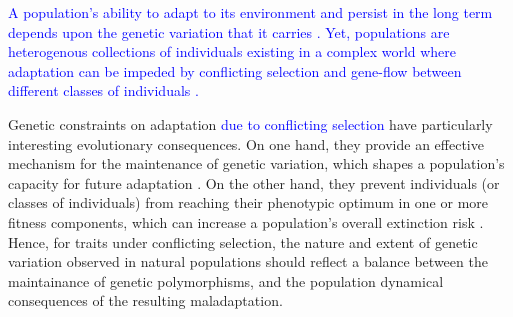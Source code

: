 \documentclass[11pt]{article}
\begin{document}
\textcolor{blue}{A population's ability to adapt to its environment and persist in the long term depends upon the genetic variation that it carries \citep{Fisher1930, Lewontin1975}. Yet, populations are heterogenous collections of individuals existing in a complex world where adaptation can be impeded by conflicting selection and gene-flow between different classes of individuals \citep{Prout2000, CharlesworthHughes2000, ConnallonHall2018}.} 

Genetic constraints on adaptation \textcolor{blue}{due to conflicting selection }have particularly interesting evolutionary consequences. On one hand, they provide an effective mechanism for the maintenance of genetic variation, which shapes a population's capacity for future adaptation \citep{Fisher1930, Prout2000, CharlesworthHughes2000, ConnallonHall2018}. On the other hand, they prevent individuals (or classes of individuals) from reaching their phenotypic optimum in one or more fitness components, which can increase a population's overall extinction risk \citep{kokko2003sexy, harts2014demography}. Hence, for traits under conflicting selection, the nature and extent of genetic variation observed in natural populations should reflect a balance between the maintainance of genetic polymorphisms, and the population dynamical consequences of the resulting maladaptation.

\end{document}
